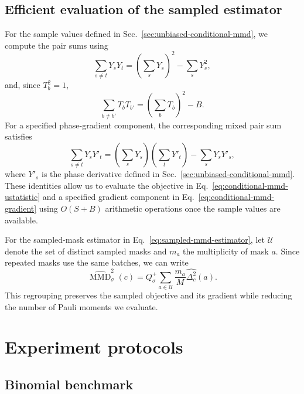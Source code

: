 \documentclass[pra,aps,10pt,twocolumn,floatfix,superscriptaddress, notitlepage,longbibliography]{revtex4-2}
\newcommand{\mmd}{\operatorname{MMD}}
\begin{document}
\subsection{Efficient evaluation of the sampled estimator}
\label{sec:appendix_estimator_evaluation}

For the sample values defined in Sec.~\ref{sec:unbiased-conditional-mmd}, we compute the pair sums using
\begin{equation}
    \sum_{s\neq t}Y_sY_t
    =
    \left(\sum_sY_s\right)^2-\sum_sY_s^2,
\end{equation}
and, since $T_b^2=1$,
\begin{equation}
    \sum_{b\neq b'}T_bT_{b'}
    =
    \left(\sum_bT_b\right)^2-B.
\end{equation}
For a specified phase-gradient component, the corresponding mixed pair sum satisfies
\begin{equation}
    \sum_{s\neq t}Y_sY'_t
    =
    \left(\sum_sY_s\right)
    \left(\sum_tY'_t\right)
    -
    \sum_sY_sY'_s,
\end{equation}
where $Y'_s$ is the phase derivative defined in Sec.~\ref{sec:unbiased-conditional-mmd}. These identities allow us to evaluate the objective in Eq.~\eqref{eq:conditional-mmd-ustatistic} and a specified gradient component in Eq.~\eqref{eq:conditional-mmd-gradient} using $O(S+B)$ arithmetic operations once the sample values are available.

For the sampled-mask estimator in Eq.~\eqref{eq:sampled-mmd-estimator}, let $\mathcal U$ denote the set of distinct sampled masks and $m_a$ the multiplicity of mask $a$. Since repeated masks use the same batches, we can write
\begin{equation}
    \widehat{\mmd}_{\sigma}^2(c)
    =
    Q_\sigma^+
    \sum_{a\in\mathcal U}
    \frac{m_a}{M}
    \widehat{\Delta_c^2}(a).
    \label{eq:compressed-mmd-estimator}
\end{equation}
This regrouping preserves the sampled objective and its gradient while reducing the number of Pauli moments we evaluate.

\section{Experiment protocols}
\label{sec:appendix_protocols}

\subsection{Binomial benchmark}
\label{sec:appendix_gaussian}
\end{document}
